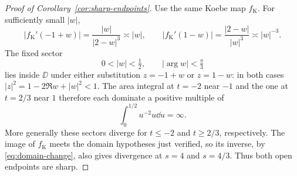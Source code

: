 \begin{proof}[Proof of Corollary~\ref{cor:sharp-endpoints}]
 Use the same Koebe map $f_{\mathrm K}$.  For sufficiently small
 $|w|$,
 \[
  |f_{\mathrm K}'(-1+w)|=\frac{|w|}{|2-w|^3}\asymp |w|,
  \qquad
  |f_{\mathrm K}'(1-w)|=\frac{|2-w|}{|w|^3}\asymp |w|^{-3}.
 \]
 The fixed sector
 \[
  0<|w|<\tfrac12,\qquad |\arg w|<\tfrac{\pi}{3}
 \]
 lies inside $\DD$ under either substitution $z=-1+w$ or
 $z=1-w$: in both cases $|z|^2=1-2\Re w+|w|^2<1$.
 The area integral at $t=-2$ near $-1$ and the one at $t=2/3$
 near $1$ therefore each dominate a positive multiple of
 \[
  \int_0^{1/2}u^{-2}u\dd u=\infty.
 \]
 More generally these sectors diverge for $t\leq-2$ and
 $t\geq2/3$, respectively.  The image of $f_{\mathrm K}$ meets
 the domain hypotheses just verified, so its inverse, by
 \eqref{eq:domain-change}, also gives divergence at $s=4$ and
 $s=4/3$.  Thus both open endpoints are sharp.
\end{proof}
